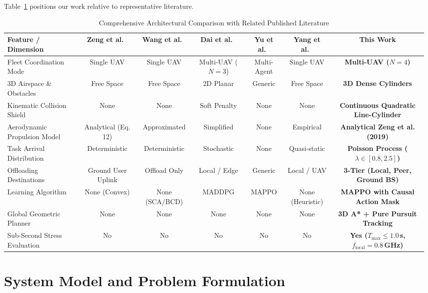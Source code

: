 \documentclass[conference]{IEEEtran}
\begin{document}
Table~\ref{tab:lit_comparison} positions our work relative to representative literature.

\begin{table}[!t]
\caption{Comprehensive Architectural Comparison with Related Published Literature}
\label{tab:lit_comparison}
\centering
\scriptsize
\begin{tabular}{lcccccc}
\toprule
\textbf{Feature / Dimension} & \textbf{Zeng et al.~\cite{zeng2019energy}} & \textbf{Wang et al.~\cite{wang2020trajectory}} & \textbf{Dai et al.~\cite{dai2022joint}} & \textbf{Yu et al.~\cite{yu2022mappo}} & \textbf{Yang et al.~\cite{yang2021uav}} & \textbf{This Work} \\
\midrule
Fleet Coordination Mode & Single UAV & Single UAV & Multi-UAV ($N=3$) & Multi-Agent & Single UAV & \textbf{Multi-UAV ($N=4$)} \\
3D Airspace \& Obstacles & Free Space & Free Space & 2D Planar & Generic & Free Space & \textbf{3D Dense Cylinders} \\
Kinematic Collision Shield & None & None & Soft Penalty & None & None & \textbf{Continuous Quadratic Line-Cylinder} \\
Aerodynamic Propulsion Model & Analytical (Eq. 12) & Approximated & Simplified & None & Empirical & \textbf{Analytical Zeng et al. (2019)} \\
Task Arrival Distribution & Deterministic & Deterministic & Stochastic & None & Quasi-static & \textbf{Poisson Process ($\lambda \in [0.8, 2.5]$)} \\
Offloading Destinations & Ground User Uplink & Offload Only & Local / Edge & Generic & Local / UAV & \textbf{3-Tier (Local, Peer, Ground BS)} \\
Learning Algorithm & None (Convex) & None (SCA/BCD) & MADDPG & MAPPO & None (Heuristic) & \textbf{MAPPO with Causal Action Mask} \\
Global Geometric Planner & None & None & None & None & None & \textbf{3D A* + Pure Pursuit Tracking} \\
Sub-Second Stress Evaluation & No & No & No & No & No & \textbf{Yes ($T_{\text{max}} \le 1.0$\,s, $f_{\text{local}} = 0.8$\,GHz)} \\
\bottomrule
\end{tabular}
\end{table}

\section{System Model and Problem Formulation}
\label{sec:system_model}
\end{document}
